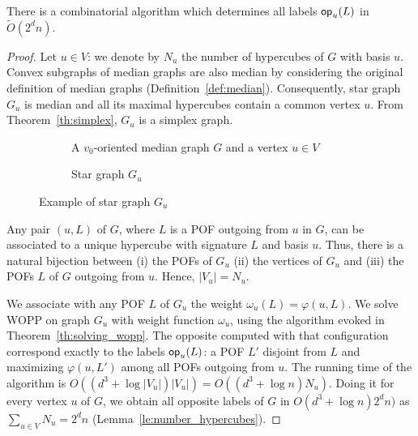 \documentclass[a4paper,UKenglish,numberwithinsect,cleveref, autoref]{lipics-v2021}
\newcommand{\card}[1]{\left| #1 \right|}
\newcommand{\opp}{\mbox{\textsf{op}}}
\begin{document}
\begin{theorem}[Computation of labels \opp]
There is a combinatorial algorithm which determines all labels $\opp_u(L)$ in $\tilde{O}(2^dn)$. 
\label{th:compute_opp}
\end{theorem}
\begin{proof}
Let $u \in V$: we denote by $N_u$ the number of hypercubes of $G$ with basis $u$. Convex subgraphs of median graphs are also median by considering the original definition of median graphs (Definition~\ref{def:median}). Consequently, star graph $G_u$ is median and all its maximal hypercubes contain a common vertex $u$. From Theorem~\ref{th:simplex}, $G_u$ is a simplex graph.

\begin{figure}[h]
\centering
\begin{subfigure}[b]{0.54\columnwidth}
\centering
\scalebox{0.8}{}
\caption{A $v_0$-oriented median graph $G$ and a vertex $u \in V$}
\label{subfig:compute_opposites_1}
\end{subfigure}
\begin{subfigure}[b]{0.44\columnwidth}
\centering
\scalebox{0.8}{}
\caption{Star graph $G_u$}
\label{subfig:compute_opposites_2}
\end{subfigure}

\caption{Example of star graph $G_u$}
\label{fig:compute_opposites}
\end{figure}

Any pair $(u,L)$ of $G$, where $L$ is a POF outgoing from $u$ in $G$, can be associated to a unique hypercube with signature $L$ and basis $u$. Thus, there is a natural bijection between (i) the POFs of $G_u$ (ii) the vertices of $G_u$ and (iii) the POFs $L$ of $G$ outgoing from $u$. Hence, $\card{V_u} = N_u$.

We associate with any POF $L$ of $G_u$ the weight $\omega_u(L) = \varphi(u,L)$. We solve WOPP on graph $G_u$ with weight function $\omega_u$, using the algorithm evoked in Theorem~\ref{th:solving_wopp}. The opposite computed with that configuration correspond exactly to the labels $\opp_u(L)$: a POF $L'$ disjoint from $L$ and maximizing $\varphi(u,L')$ among all POFs outgoing from $u$. The running time of the algorithm is $O((d^3+\log \card{V_u})\card{V_u}) = O((d^3+\log n)N_u)$. Doing it for every vertex $u$ of $G$, we obtain all opposite labels of $G$ in $O(d^3+\log n)2^dn)$ as $\sum_{u \in V} N_u = 2^dn$ (Lemma~\ref{le:number_hypercubes}).
\end{proof}
\end{document}
